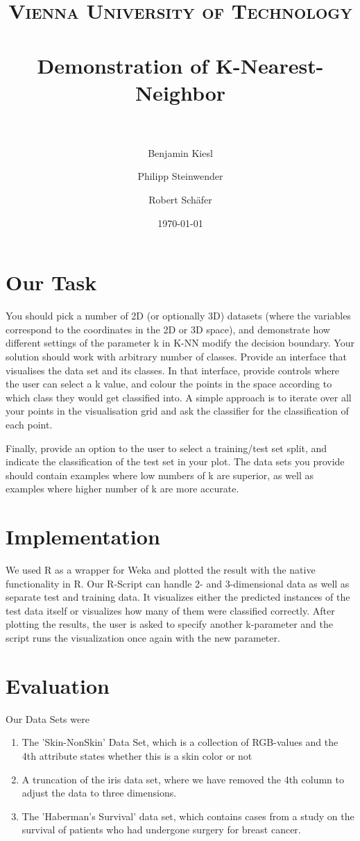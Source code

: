 \documentclass[paper=a4, fontsize=11pt]{scrartcl} %
\title{	
\normalfont \normalsize 
\textsc{Vienna University of Technology} \\ [25pt] %
\horrule{0.5pt} \\[0.4cm] %
\huge Demonstration of K-Nearest-Neighbor \\ %
\horrule{2pt} \\[0.5cm] %
}
\author{Benjamin Kiesl \and Philipp Steinwender \and Robert Schäfer} %
\date{\normalsize\today} %
\numberwithin{equation}{section} %
\numberwithin{figure}{section} %
\numberwithin{table}{section} %
\begin{document}
\maketitle %


\section{Our Task}

You should pick a number of 2D (or optionally 3D) datasets (where the variables correspond to the coordinates in the 2D or 3D space), and demonstrate how different settings of the parameter k in K-NN modify the decision boundary. Your solution should work with arbitrary number of classes.
Provide an interface that visualises the data set and its classes. In that interface, provide controls where the user can select a k value, and colour the points in the space according to which class they would get classified into. A simple approach is to iterate over all your points in the visualisation grid and ask the classifier for the classification of each point.

Finally, provide an option to the user to select a training/test set split, and indicate the classification of the test set in your plot.
The data sets you provide should contain examples where low numbers of k are superior, as well as examples where higher number of k are more accurate.

\section{Implementation}

We used R as a wrapper for Weka and plotted the result with the native functionality in R. Our R-Script can handle 2- and 3-dimensional data as well as separate test and training data. It visualizes either the predicted instances of the test data itself or visualizes how many of them were classified correctly. After plotting the results, the user is asked to specify another k-parameter and the script runs the visualization once again with the new parameter.

\section{Evaluation}
Our Data Sets were 
\begin{enumerate}
\item
    The 'Skin-NonSkin' Data Set, which is a collection of RGB-values and the 4th attribute states whether this is a skin color or not
\item
    A truncation of the iris data set, where we have removed the 4th column to adjust the data to three dimensions.
\item
    The 'Haberman's Survival' data set, which contains cases from a study on the survival of patients who had undergone surgery for breast cancer.
\end{enumerate}
\end{document}
